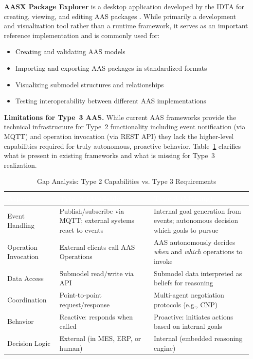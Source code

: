 \textbf{AASX Package Explorer} is a desktop application developed by the \ac{IDTA} for creating, viewing, and editing \ac{AAS} packages \cite{2023aasxexplorer}. While primarily a development and visualization tool rather than a runtime framework, it serves as an important reference implementation and is commonly used for:
\begin{itemize}
    \item Creating and validating \ac{AAS} models
    \item Importing and exporting \ac{AAS} packages in standardized formats
    \item Visualizing submodel structures and relationships
    \item Testing interoperability between different \ac{AAS} implementations
\end{itemize}


\textbf{Limitations for Type~3 AAS.} 
While current \ac{AAS} frameworks provide the technical infrastructure for Type~2 functionality including event notification (via MQTT) and operation invocation (via REST API) they lack the higher-level capabilities required for truly autonomous, proactive behavior. Table~\ref{tab:type3_gap} clarifies what is present in existing frameworks and what is missing for Type~3 realization.

\begin{table}[ht]
\centering
\caption{Gap Analysis: Type 2 Capabilities vs. Type 3 Requirements}
\label{tab:type3_gap}
\begin{tabular}{p{}p{}p{}}
\toprule
\rowcolor{headerblue}
\textcolor{white}{Aspect} & \textcolor{white}{Type 2 (Available)} & \textcolor{white}{Type 3 (Missing)} \\
\midrule
Event Handling & Publish/subscribe via MQTT; external systems react to events & Internal goal generation from events; autonomous decision which goals to pursue \\
\rowcolor{lightgray}
Operation Invocation & External clients call AAS Operations & AAS autonomously decides \textit{when} and \textit{which} operations to invoke \\
Data Access & Submodel read/write via API & Submodel data interpreted as beliefs for reasoning \\
\rowcolor{lightgray}
Coordination & Point-to-point request/response & Multi-agent negotiation protocols (e.g., CNP) \\
Behavior & Reactive: responds when called & Proactive: initiates actions based on internal goals \\
\rowcolor{lightgray}
Decision Logic & External (in MES, ERP, or human) & Internal (embedded reasoning engine) \\
\bottomrule
\end{tabular}
\end{table}

